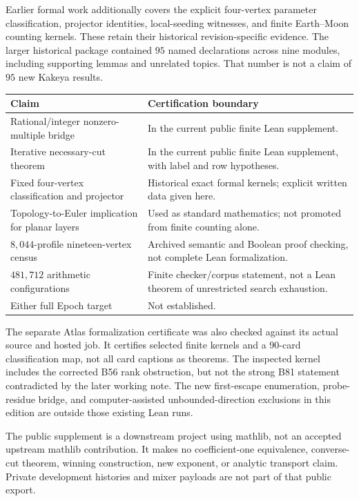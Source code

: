 \documentclass[11pt,letterpaper]{article}
\theoremstyle{definition}
\theoremstyle{remark}\newtheorem{remark}[theorem]{Remark}
\begin{document}
Earlier formal work additionally covers the explicit four-vertex parameter classification, projector identities, local-seeding witnesses, and finite Earth--Moon counting kernels. These retain their historical revision-specific evidence. The larger historical package contained $95$ named declarations across nine modules, including supporting lemmas and unrelated topics. That number is not a claim of $95$ new Kakeya results.

\begin{center}\small
\begin{tabular}{p{}p{}}\toprule
Claim&Certification boundary\\\midrule
Rational/integer nonzero-multiple bridge&In the current public finite Lean supplement.\\
Iterative necessary-cut theorem&In the current public finite Lean supplement, with label and row hypotheses.\\
Fixed four-vertex classification and projector&Historical exact formal kernels; explicit written data given here.\\
Topology-to-Euler implication for planar layers&Used as standard mathematics; not promoted from finite counting alone.\\
$8,044$-profile nineteen-vertex census&Archived semantic and Boolean proof checking, not complete Lean formalization.\\
$481,712$ arithmetic configurations&Finite checker/corpus statement, not a Lean theorem of unrestricted search exhaustion.\\
Either full Epoch target&Not established.\\\bottomrule
\end{tabular}
\end{center}
The separate Atlas formalization certificate was also checked against its actual source and hosted job. It certifies selected finite kernels and a 90-card classification map, not all card captions as theorems. The inspected kernel includes the corrected B56 rank obstruction, but not the strong B81 statement contradicted by the later working note. The new first-escape enumeration, probe-residue bridge, and computer-assisted unbounded-direction exclusions in this edition are outside those existing Lean runs.

The public supplement is a downstream project using mathlib, not an accepted upstream mathlib contribution. It makes no coefficient-one equivalence, converse-cut theorem, winning construction, new exponent, or analytic transport claim. Private development histories and mixer payloads are not part of that public export.
\end{document}
